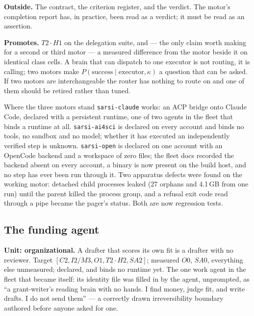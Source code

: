 \documentclass[11pt]{article}
\theoremstyle{definition}
\begin{document}
\textbf{Outside.} The contract, the criterion register, and the verdict. The motor's completion report has, in practice, been read as a verdict; it must be read as an assertion.

\textbf{Promotes.} $T2\cdot H1$ on the delegation suite, and --- the only claim worth making for a second or third motor --- a measured difference from the motor beside it on identical class cells. A brain that can dispatch to one executor is not routing, it is calling; two motors make $P(\text{success}\mid\text{executor},\kappa)$ a question that can be asked. If two motors are interchangeable the router has nothing to route on and one of them should be retired rather than tuned.

\begin{cautionbox}{Where the three motors stand}
\texttt{sarsi-claude} works: an ACP bridge onto Claude Code, declared with a persistent runtime, one of two agents in the fleet that binds a runtime at all. \texttt{sarsi-ai4sci} is declared on every account and binds no tools, no sandbox and no model; whether it has executed an independently verified step is unknown. \texttt{sarsi-open} is declared on one account with an OpenCode backend and a workspace of zero files; the fleet docs recorded the backend absent on every account, a binary is now present on the build host, and no step has ever been run through it. Two apparatus defects were found on the working motor: detached child processes leaked (27 orphans and 4.1\,GB from one run) until the parent killed the process group, and a refusal exit code read through a pipe became the pager's status. Both are now regression tests.
\end{cautionbox}

\subsection{The funding agent}\label{sec:funding}

\textbf{Unit: organizational.} A drafter that scores its own fit is a drafter with no reviewer. Target $[C2, I2/M3, O1, T2\cdot H2, SA2]$; measured $O0$, $SA0$, everything else unmeasured; declared, and binds no runtime yet. The one work agent in the fleet that became itself: its identity file was filled in by the agent, unprompted, as ``a grant-writer's reading brain with no hands. I find money, judge fit, and write drafts. I do not send them'' --- a correctly drawn irreversibility boundary authored before anyone asked for one.
\end{document}
